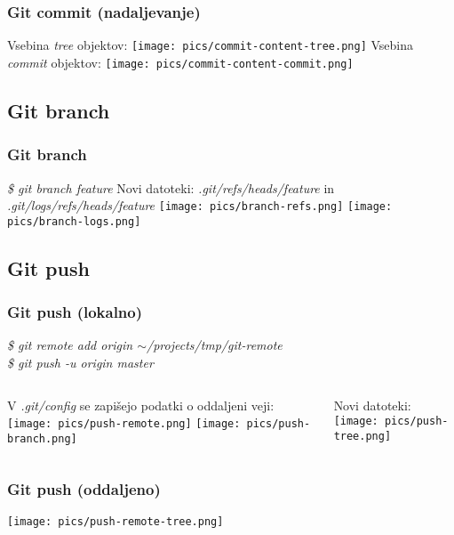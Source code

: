 \documentclass{beamer}
\begin{document}
\begin{frame}
  \frametitle{Git commit (nadaljevanje)}
  Vsebina \emph{tree} objektov:
  \texttt{[image: pics/commit-content-tree.png]}
  Vsebina \emph{commit} objektov:
  \texttt{[image: pics/commit-content-commit.png]}
\end{frame}

\subsection{Git branch}
\begin{frame}
  \frametitle{Git branch}
  \emph{\$ git branch feature}
  \newline
  Novi datoteki: \emph{.git/refs/heads/feature} in \emph{.git/logs/refs/heads/feature}
  \texttt{[image: pics/branch-refs.png]}
  \texttt{[image: pics/branch-logs.png]}
\end{frame}

\subsection{Git push}
\begin{frame}
  \frametitle{Git push (lokalno)}
  \emph{\$ git remote add origin $\sim$/projects/tmp/git-remote}\\
  \emph{\$ git push -u origin master}
  \newline
  \begin{columns}[c]
    \begin{column}{.5\textwidth}
      V \emph{.git/config} se zapišejo podatki o oddaljeni veji:
      \texttt{[image: pics/push-remote.png]}
      \texttt{[image: pics/push-branch.png]}
    \end{column}
    \begin{column}{.5\textwidth}
      Novi datoteki:
      \texttt{[image: pics/push-tree.png]}
    \end{column}
  \end{columns}
\end{frame}

\begin{frame}
  \frametitle{Git push (oddaljeno)}
  \texttt{[image: pics/push-remote-tree.png]}
\end{frame}
\end{document}

